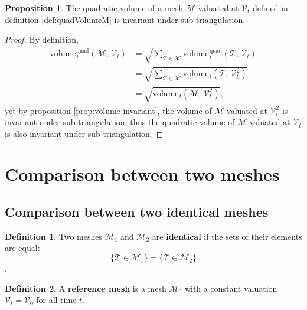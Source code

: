 \documentclass{article}
\theoremstyle{definition}
\newtheorem{defn}{Definition}
\newtheorem{prop}{Proposition}
\newcommand{\MM}{\mathcal{M}}
\newcommand{\VV}{\mathcal{V}}
\newcommand{\TT}{\mathcal{T}}
\newcommand{\vol}{\mathrm{volume\hspace{1pt}}}
\newcommand{\quadvol}{\mathrm{volume\hspace{1pt}}^\mathrm{quad}}
\begin{document}
\begin{prop}
The quadratic volume of a mesh $\MM$ valuated at $\VV_t$ defined in definition \ref{def:quadVolumeM} is invariant under sub-triangulation.\label{prop:quadvolume-invariant}
\end{prop}
\begin{proof}[Proof]By definition,
\begin{align*}
\quadvol_t(\MM,\,\VV_t) & = \sqrt{\sum_{\TT\in\MM}\quadvol_t(\TT,\,\VV_t)}\\
& = \sqrt{\sum_{\TT\in\MM}\vol_t(\TT,\,\VV_t^2)}\\
& = \sqrt{\vol_t(\MM,\,\VV_t^2)},
\end{align*}
yet by proposition \ref{prop:volume-invariant}, the volume of $\MM$ valuated at $\VV_t^2$ is invariant under sub-triangulation, thus the quadratic volume of $\MM$ valuated at $\VV_t$ is also invariant under sub-triangulation.
\end{proof}



\section{Comparison between two meshes}


\subsection{Comparison between two identical meshes}
\begin{defn}
Two meshes $\MM_1$ and $\MM_2$ are \textbf{identical} if the sets of their elements are equal: 
\[\{\TT\in\MM_1\} = \{\TT\in\MM_2\}\].
\end{defn}

\begin{defn}
A \textbf{reference mesh} is a mesh $\MM_0$ with a constant valuation $\VV_t = \VV_0$ for all time $t$.
\end{defn}
\end{document}

